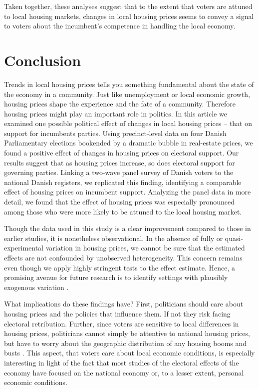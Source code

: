 \documentclass[12pt,a4paper]{article}
\begin{document}
Taken together, these analyses suggest that to the extent that voters are attuned to local housing markets, changes in local housing prices seems to convey a signal to voters about the incumbent's competence in handling the local economy.
		
\section{Conclusion}
	Trends in local housing prices tells you something fundamental about the state of the economy in a community. Just like unemployment or local economic growth, housing prices shape the experience and the fate of a community. Therefore housing prices might play an important role in politics. In this article we examined one possible political effect of changes in local housing prices – that on support for incumbents parties. Using precinct-level data on four Danish Parliamentary elections bookended by a dramatic bubble in real-estate prices, we found a positive effect of changes in housing prices on electoral support. Our results suggest that as housing prices increase, so does electoral support for governing parties. Linking a two-wave panel survey of Danish voters to the national Danish registers, we replicated this finding, identifying a comparable effect of housing prices on incumbent support. Analyzing the panel data in more detail, we found that the effect of housing prices was especially pronounced among those who were more likely to be attuned to the local housing market. 
	
	Though the data used in this study is a clear improvement compared to those in earlier studies, it is nonetheless observational. In the absence of fully or quasi-experimental variation in housing prices, we cannot be sure that the estimated effects are not confounded by unobserved heterogeneity. This concern remains even though we apply highly stringent tests to the effect estimate. Hence, a promising avenue for future research is to identify settings with plausibly exogenous variation \citep[cf.]{jerzak2016property}.
	
	What implications do these findings have? First, politicians should care about housing prices and the policies that influence them. If not they risk facing electoral retribution. Further, since voters are sensitive to  local differences in housing prices, politicians cannot simply be attentive to national housing prices, but have to worry about the geographic distribution of any housing booms and busts \citep[cf.][11]{ferejohn1986incumbent}. This aspect, that voters care about local economic conditions, is especially interesting in light of the fact that most studies of the electoral effects of the economy have focused on the national economy or, to a lesser extent, personal economic conditions.
	
\end{document}
